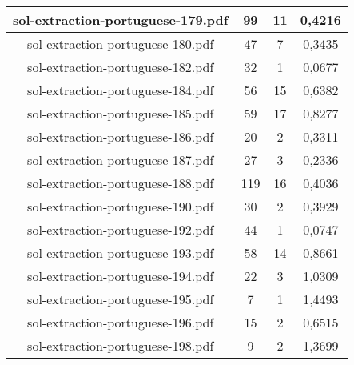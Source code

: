 \documentclass[11pt]{article}
\newlength\mylength
\begin{document}
\begin{center}
\begin{longtable}{||C{.40\mylength}||C{.30\mylength}||C{.30\mylength}||C{.30\mylength}||}
  sol-extraction-portuguese-179.pdf & 99 & 11 & 0,4216 \\  \hline
  sol-extraction-portuguese-180.pdf & 47 & 7 & 0,3435 \\  \hline
  sol-extraction-portuguese-182.pdf & 32 & 1 & 0,0677 \\  \hline
  sol-extraction-portuguese-184.pdf & 56 & 15 & 0,6382 \\  \hline
  sol-extraction-portuguese-185.pdf & 59 & 17 & 0,8277 \\  \hline
  sol-extraction-portuguese-186.pdf & 20 & 2 & 0,3311 \\  \hline
  sol-extraction-portuguese-187.pdf & 27 & 3 & 0,2336 \\  \hline
  sol-extraction-portuguese-188.pdf & 119 & 16 & 0,4036 \\  \hline
  sol-extraction-portuguese-190.pdf & 30 & 2 & 0,3929 \\  \hline
  sol-extraction-portuguese-192.pdf & 44 & 1 & 0,0747 \\  \hline
  sol-extraction-portuguese-193.pdf & 58 & 14 & 0,8661 \\  \hline
  sol-extraction-portuguese-194.pdf & 22 & 3 & 1,0309 \\  \hline
  sol-extraction-portuguese-195.pdf & 7 & 1 & 1,4493 \\  \hline
  sol-extraction-portuguese-196.pdf & 15 & 2 & 0,6515 \\  \hline
  sol-extraction-portuguese-198.pdf & 9 & 2 & 1,3699 \\  \hline

\end{longtable}
\end{center}
\end{document}
